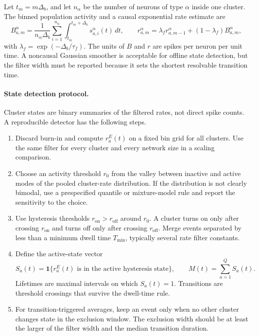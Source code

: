 \begin{keyequation}
Let \(t_m=m\Delta_b\), and let \(n_\alpha\) be the number of neurons of type
\(\alpha\) inside one cluster. The binned population activity and a causal
exponential rate estimate are
\begin{equation}
    B_{a,m}^{\alpha}
    =
    \frac{1}{n_\alpha\Delta_b}
    \sum_{i=1}^{n_\alpha}
    \int_{t_m}^{t_m+\Delta_b}
    s_{a,i}^{\alpha}(t)\,dt ,
    \qquad
    r_{a,m}^{\alpha}
    =
    \lambda_f r_{a,m-1}^{\alpha}
    +
    (1-\lambda_f)B_{a,m}^{\alpha},
    \label{eq:ch09-discrete-rate-filter}
\end{equation}
with \(\lambda_f=\exp(-\Delta_b/\tau_f)\). The units of \(B\) and \(r\) are
spikes per neuron per unit time. A noncausal Gaussian smoother is acceptable
for offline state detection, but the filter width must be reported because it
sets the shortest resolvable transition time.
\end{keyequation}

\paragraph{State detection protocol.}
Cluster states are binary summaries of the filtered rates, not direct spike
counts. A reproducible detector has the following steps.
\begin{enumerate}
    \item Discard burn-in and compute \(r_a^E(t)\) on a fixed bin grid for all
    clusters. Use the same filter for every cluster and every network size in a
    scaling comparison.
    \item Choose an activity threshold \(r_0\) from the valley between inactive
    and active modes of the pooled cluster-rate distribution. If the
    distribution is not clearly bimodal, use a prespecified quantile or
    mixture-model rule and report the sensitivity to the choice.
    \item Use hysteresis thresholds \(r_{\mathrm{on}}>r_{\mathrm{off}}\) around
    \(r_0\). A cluster turns on only after crossing \(r_{\mathrm{on}}\) and
    turns off only after crossing \(r_{\mathrm{off}}\). Merge events separated
    by less than a minimum dwell time \(T_{\min}\), typically several rate
    filter constants.
    \item Define the active-state vector
    \[
        S_a(t)=\mathbf 1\{r_a^E(t)\text{ is in the active hysteresis state}\},
        \qquad
        M(t)=\sum_{a=1}^Q S_a(t).
    \]
    Lifetimes are maximal intervals on which \(S_a(t)=1\). Transitions are
    threshold crossings that survive the dwell-time rule.
    \item For transition-triggered averages, keep an event only when no other
    cluster changes state in the exclusion window. The exclusion width should
    be at least the larger of the filter width and the median transition
    duration.
\end{enumerate}

